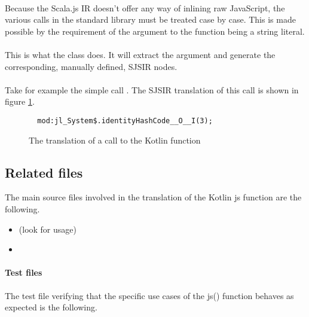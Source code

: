 \paragraph{} Because the Scala.js IR doesn't offer any way of inlining raw JavaScript, the various calls 
in the standard library must be treated case by case. This is made possible by the requirement of 
the argument to the function being a string literal. 

\paragraph{} This is what the  class does. It will extract the argument and 
generate the corresponding, manually defined, SJSIR nodes.

\paragraph{} Take for example the simple call . The SJSIR translation of this call is shown in figure \ref{js_fun_example}.

\begin{figure}[h]
  \begin{verbatim}
  mod:jl_System$.identityHashCode__O__I(3);
  \end{verbatim}
  \caption{The translation of a call to the Kotlin  function}
  \label{js_fun_example}
\end{figure}

\subsection{Related files} The main source files involved in the translation of the Kotlin js 
function are the following.

\begin{itemize}
 \item {} (look for  usage)
 \item {}
\end{itemize}

\paragraph{Test files} The test file verifying that the specific use cases of the js() function 
behaves as expected is the following.

